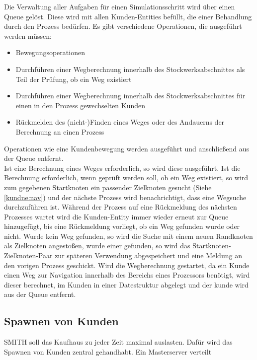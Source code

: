 Die Verwaltung aller Aufgaben für einen Simulationsschritt wird über einen Queue gelöst. Diese wird mit allen Kunden-Entities befüllt, die einer Behandlung durch den Prozess bedürfen.
Es gibt verschiedene Operationen, die ausgeführt werden müssen:
\begin{itemize}
\item Bewegungsoperationen
\item Durchführen einer Wegberechnung innerhalb des Stockwerksabschnittes als Teil der Prüfung, ob ein Weg existiert
\item Durchführen einer Wegberechnung innerhalb des Stockwerksabschnittes für einen in den Prozess gewechselten Kunden
\item Rückmelden des (nicht-)Finden eines Weges oder des Andauerns der Berechnung an einen Prozess
\end{itemize}
Operationen wie eine Kundenbewegung werden ausgeführt und anschließend aus der Queue entfernt.\\
Ist eine Berechnung eines Weges erforderlich, so wird diese ausgeführt. Ist die Berechnung erforderlich, wenn geprüft werden soll, ob ein Weg existiert, so wird zum gegebenen Startknoten ein passender Zielknoten gesucht (Siehe \ref{kundne:nav}) und der nächste Prozess wird benachrichtigt, dass eine Wegsuche durchzuführen ist. Während der Prozess auf eine Rückmeldung des nächsten Prozesses wartet wird die Kunden-Entity immer wieder erneut zur Queue hinzugefügt, bis eine Rückmeldung vorliegt, ob ein Weg gefunden wurde oder nicht. Wurde kein Weg gefunden, so wird die Suche mit einem neuen Randknoten als Zielknoten angestoßen, wurde einer gefunden, so wird das Startknoten-Zielknoten-Paar zur späteren Verwendung abgespeichert und eine Meldung an den vorigen Prozess geschickt. Wird die Wegberechnung gestartet, da ein Kunde einen Weg zur Navigation innerhalb des Bereichs eines Prozessors benötigt, wird dieser berechnet, im Kunden in einer Datestruktur abgelegt und der kunde wird aus der Queue entfernt.

\subsection{Spawnen von Kunden}
SMITH soll das Kaufhaus zu jeder Zeit maximal auslasten. Dafür wird das Spawnen von Kunden zentral gehandhabt. Ein Masterserver verteilt 